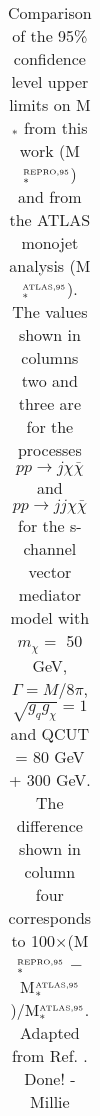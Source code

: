 \begin{flushleft}
\begin{table}[!htbp]
\begin{tabular}{c|c|c|c}
 \hline
 \hline
\end{tabular}
\caption{Comparison of the 95\% confidence level upper limits on M$_{*}$ from this work (M$_{*}^{\mbox{\tiny REPRO,95}}$) and from the ATLAS monojet analysis (M$_{*}^{\mbox{\tiny ATLAS,95}}$). The values shown in columns two and three are   for the processes $pp \rightarrow j\chi\bar{\chi}$ and $pp \rightarrow jj\chi\bar{\chi}$ for the s-channel vector mediator model with $m_{\chi} = $ 50 GeV, $\Gamma = M/8\pi$, $\sqrt{g_{q}g_{\chi}} = 1$ and QCUT = 80 GeV + 300 GeV. The difference shown in column four corresponds to 100$\times$(M$_{*}^{\mbox{\tiny REPRO,95}}$ $-$ M$_{*}^{\mbox{\tiny ATLAS,95}}$)/M$_{*}^{\mbox{\tiny ATLAS,95}}$.
Adapted from Ref. \cite{Aad:2015zva}.  Done! - Millie}
\label{M_star_limits_monojet}
\end{table}
\end{flushleft}

